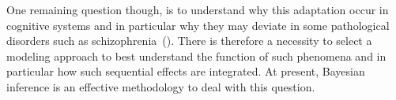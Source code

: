 \documentclass[profile,final,english, draft]{article}%
\newcommand{\citep}[1]{(\cite{#1})}
\begin{document}
One remaining question though, is to understand why
this adaptation occur in cognitive systems and
in particular why they may deviate
in some pathological disorders such as schizophrenia~\citep{Adams2010}.
There is therefore a necessity to select
a modeling approach to best understand the function of such phenomena
and in particular how such sequential effects are integrated.
At present, Bayesian inference is an effective methodology
to deal with this question.
\end{document}
